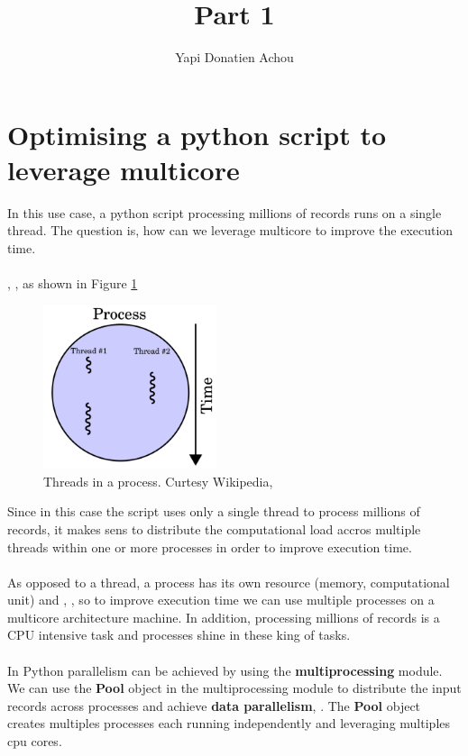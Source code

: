 \documentclass[11pt, oneside]{article}   	%
\title{Part 1}
\author{Yapi Donatien Achou}
\begin{document}
\maketitle

\section{Optimising a python script to leverage multicore}
In this use case, a python script processing millions of records runs on a single thread. The question is, how can we leverage multicore to improve the execution time.\\
\\
, \cite{threads}, as shown in Figure \ref{fig:threads}

\begin{figure}[H] %
   \centering
   \includegraphics[width=2in]{images/threads.png} 
   \caption{Threads in a process. Curtesy Wikipedia, \cite{threads}}
   \label{fig:threads}
\end{figure}

Since in this case the script uses only a single thread to process millions of records, it makes  sens to distribute the computational load accros multiple threads within one or more processes in order to improve execution time.\\
\\
As opposed to a thread, a process has its own resource (memory, computational unit) and , \cite{process}, so to improve execution time we can use multiple processes on a multicore architecture machine. In addition, processing millions of records is a CPU intensive task and processes shine in these king of tasks.\\
\\
In Python parallelism can be achieved by using the \textbf{multiprocessing} module. We can use the \textbf{Pool} object in the multiprocessing module to distribute the input records across processes and achieve \textbf{data parallelism}, \cite{multiprocess}. The \textbf{Pool} object creates multiples processes each running independently and leveraging multiples cpu cores. \\
\\
\end{document}
